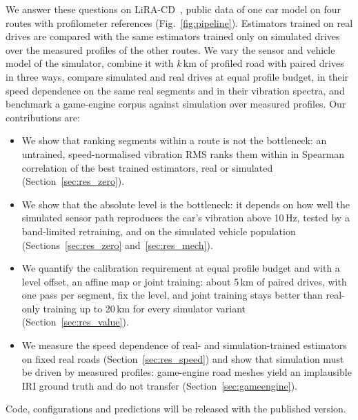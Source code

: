 We answer these questions on LiRA-CD~\cite{skar2023lira}, public data of one car model on four routes with profilometer references (Fig.~\ref{fig:pipeline}).
Estimators trained on real drives are compared with the same estimators trained only on simulated drives over the measured profiles of the other routes.
We vary the sensor and vehicle model of the simulator, combine it with $k$\,km of profiled road with paired drives in three ways, compare simulated and real drives at equal profile budget, in their speed dependence on the same real segments and in their vibration spectra, and benchmark a game-engine corpus against simulation over measured profiles.
Our contributions are:
\begin{itemize}
\item We show that ranking segments within a route is not the bottleneck: an untrained, speed-normalised vibration RMS ranks them within \rpAbsMax{} in Spearman correlation of the best trained estimators, real or simulated (Section~\ref{sec:res_zero}).
\item We show that the absolute level is the bottleneck: it depends on how well the simulated sensor path reproduces the car's vibration above 10\,Hz, tested by a band-limited retraining, and on the simulated vehicle population (Sections~\ref{sec:res_zero} and~\ref{sec:res_mech}).
\item We quantify the calibration requirement at equal profile budget and with a level offset, an affine map or joint training: about 5\,km of paired drives, with one pass per segment, fix the level, and joint training stays better than real-only training up to 20\,km for every simulator variant (Section~\ref{sec:res_value}).
\item We measure the speed dependence of real- and simulation-trained estimators on fixed real roads (Section~\ref{sec:res_speed}) and show that simulation must be driven by measured profiles: game-engine road meshes yield an implausible IRI ground truth and do not transfer (Section~\ref{sec:gameengine}).
\end{itemize}
Code, configurations and predictions will be released with the published version.
